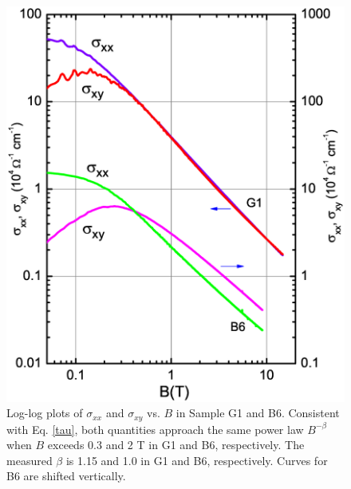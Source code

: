 \begin{figure}[!htbp]
  \begin{center}
\includegraphics[width=0.8\linewidth]{ch-na3bi/figures/FigLogSigxy}
\caption{\label{figCond} 
Log-log plots of $\sigma_{xx}$ and $\sigma_{xy}$ vs. $B$ in Sample G1 and B6. Consistent with Eq. \ref{tau}, both quantities approach the same power law $B^{-\beta}$ when $B$ exceeds 0.3 and 2 T in G1 and B6, respectively. The measured $\beta$ is 1.15 and 1.0 in G1 and B6, respectively. Curves for B6 are shifted vertically.
}
  \end{center}
\end{figure}

